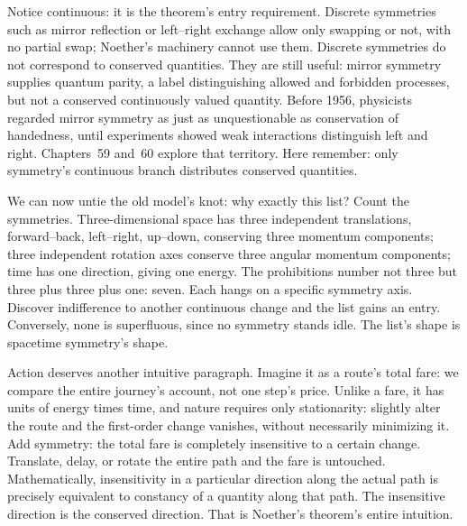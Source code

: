 Notice continuous: it is the theorem's entry requirement. Discrete symmetries such as mirror reflection or left--right exchange allow only swapping or not, with no partial swap; Noether's machinery cannot use them. Discrete symmetries do not correspond to conserved quantities. They are still useful: mirror symmetry supplies quantum parity, a label distinguishing allowed and forbidden processes, but not a conserved continuously valued quantity. Before 1956, physicists regarded mirror symmetry as just as unquestionable as conservation of handedness, until experiments showed weak interactions distinguish left and right. Chapters~59 and~60 explore that territory. Here remember: only symmetry's continuous branch distributes conserved quantities.

We can now untie the old model's knot: why exactly this list? Count the symmetries. Three-dimensional space has three independent translations, forward--back, left--right, up--down, conserving three momentum components; three independent rotation axes conserve three angular momentum components; time has one direction, giving one energy. The prohibitions number not three but three plus three plus one: seven. Each hangs on a specific symmetry axis. Discover indifference to another continuous change and the list gains an entry. Conversely, none is superfluous, since no symmetry stands idle. The list's shape is spacetime symmetry's shape.

Action deserves another intuitive paragraph. Imagine it as a route's total fare: we compare the entire journey's account, not one step's price. Unlike a fare, it has units of energy times time, and nature requires only stationarity: slightly alter the route and the first-order change vanishes, without necessarily minimizing it. Add symmetry: the total fare is completely insensitive to a certain change. Translate, delay, or rotate the entire path and the fare is untouched. Mathematically, insensitivity in a particular direction along the actual path is precisely equivalent to constancy of a quantity along that path. The insensitive direction is the conserved direction. That is Noether's theorem's entire intuition.

